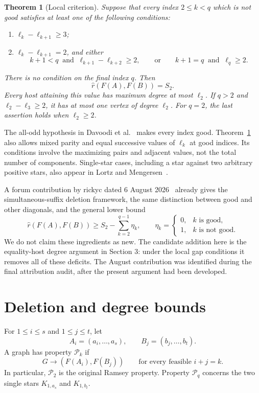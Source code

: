 \documentclass[11pt]{article}
\newtheorem{theorem}{Theorem}
\theoremstyle{remark}\newtheorem{remark}[theorem]{Remark}
\newcommand{\sr}{\widehat r}
\begin{document}
\begin{theorem}[Local criterion]\label{thm:local}
Suppose that every index $2\le k<q$ which is not good satisfies at least one of the following conditions:
\begin{enumerate}
\item $\ell_k-\ell_{k+1}\ge3$;
\item $\ell_k-\ell_{k+1}=2$, and either
\[
 k+1<q\ \text{ and }\ \ell_{k+1}-\ell_{k+2}\ge2,
 \qquad\text{or}\qquad k+1=q\ \text{ and }\ \ell_q\ge2.
\]
\end{enumerate}
There is no condition on the final index $q$. Then
\[
 \sr(F(A),F(B))=S_2.
\]
Every host attaining this value has maximum degree at most $\ell_2$. If $q>2$ and $\ell_2-\ell_3\ge2$, it has at most one vertex of degree $\ell_2$. For $q=2$, the last assertion holds when $\ell_2\ge2$.
\end{theorem}

The all-odd hypothesis in Davoodi et al.~\cite{DJKR} makes every index good. Theorem~\ref{thm:local} also allows mixed parity and equal successive values of $\ell_k$ at good indices. Its conditions involve the maximizing pairs and adjacent values, not the total number of components. Single-star cases, including a star against two arbitrary positive stars, also appear in Lortz and Mengersen~\cite[Theorem 7]{LM}.

A forum contribution by rickyc dated 6 August 2026~\cite{rickyc} already gives the simultaneous-suffix deletion framework, the same distinction between good and other diagonals, and the general lower bound
\[
 \sr(F(A),F(B))\ge S_2-\sum_{k=2}^{q-1}\eta_k,
 \qquad
 \eta_k=\begin{cases}0,&k\text{ is good},\\1,&k\text{ is not good}.\end{cases}
\]
We do not claim these ingredients as new. The candidate addition here is the equality-host degree argument in Section 3: under the local gap conditions it removes all of these deficits. The August contribution was identified during the final attribution audit, after the present argument had been developed.

\section{Deletion and degree bounds}
For $1\le i\le s$ and $1\le j\le t$, let
\[
 A_i=(a_i,\ldots,a_s),\qquad B_j=(b_j,\ldots,b_t).
\]
A graph has property $\mathcal P_k$ if
\[
 G\to(F(A_i),F(B_j))\qquad\text{for every feasible }i+j=k.
\]
In particular, $\mathcal P_2$ is the original Ramsey property. Property $\mathcal P_q$ concerns the two single stars $K_{1,a_s}$ and $K_{1,b_t}$.
\end{document}
